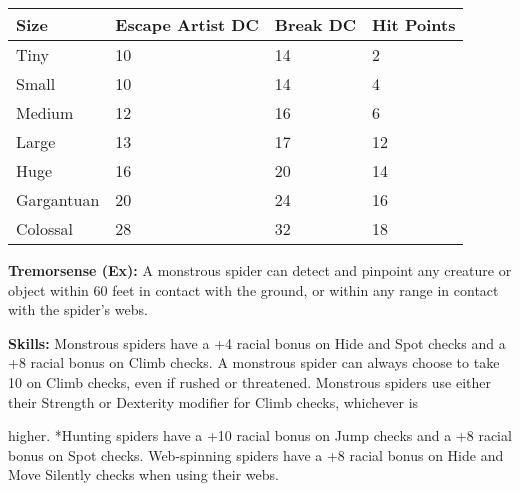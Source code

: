 \documentclass{article}
\begin{document}
\begin{tabular}{|>{\raggedright}p{45pt}|>{\raggedright}p{73pt}|>{\raggedright}p{41pt}|>{\raggedright}p{41pt}|}
\hline
S\textbf{ize} & E\textbf{scape Artist DC} & B\textbf{reak DC} & H\textbf{it Points}\tabularnewline
\hline
Tiny & 10 & 14 & 2\tabularnewline
\hline
Small & 10 & 14 & 4\tabularnewline
\hline
Medium & 12 & 16 & 6\tabularnewline
\hline
Large & 13 & 17 & 12\tabularnewline
\hline
Huge & 16 & 20 & 14\tabularnewline
\hline
Gargantuan & 20 & 24 & 16\tabularnewline
\hline
Colossal & 28 & 32 & 18\tabularnewline
\hline
\end{tabular}

\textbf{Tremorsense (Ex): }A monstrous spider can detect and pinpoint any creature 
or object within 60 feet in contact with the ground, or within any range in contact 
with the spider's webs.

\textbf{Skills:} Monstrous spiders have a +4 racial bonus on Hide and Spot checks 
and a +8 racial bonus on Climb checks. A monstrous spider can always choose to 
take 10 on Climb checks, even if rushed or threatened. Monstrous spiders use either 
their Strength or Dexterity modifier for Climb checks, whichever is

higher. *Hunting spiders have a +10 racial bonus on Jump checks and a +8 racial 
bonus on Spot checks. Web-spinning spiders have a +8 racial bonus on Hide and Move 
Silently checks when using their webs.

\newpage
\end{document}

